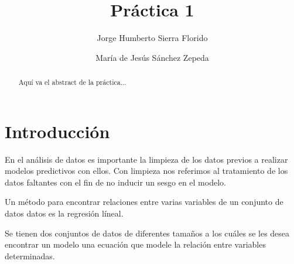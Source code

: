 \documentclass[sigconf]{acmart}
\begin{document}
\title{Práctica 1}

\author{Jorge Humberto Sierra Florido}

\author{María de Jesús Sánchez Zepeda}






\begin{abstract}
  Aqu{\'i} va el abstract de la pr{\'a}ctica...
\end{abstract}




\maketitle

\section{Introducción}

En el análisis de datos es importante la limpieza de los datos previos a realizar modelos predictivos con ellos. Con limpieza nos referimos al tratamiento de los datos faltantes con el fin de no inducir un sesgo en el modelo.

Un método para encontrar relaciones entre varias variables de un conjunto de datos datos es la regresión líneal.

Se tienen dos conjuntos de datos de diferentes tamaños a los cuáles se les desea encontrar un modelo una ecuación que modele la relación entre variables determinadas.
\end{document}
